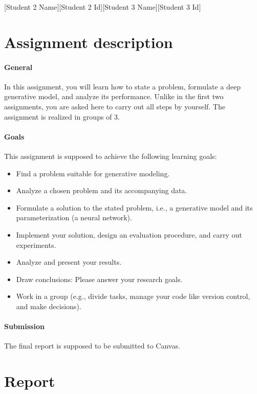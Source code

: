 \documentclass[a4 paper]{article}
\begin{document}
{[Student 2 Name]}{[Student 2 Id]}{[Student 3 Name]}{[Student 3 Id]}

\section{Assignment description}

\paragraph{General} In this assignment, you will learn how to state a problem, formulate a deep generative model, and analyze its performance. Unlike in the first two assignments, you are asked here to carry out all steps by yourself. The assignment is realized in groups of 3.

\paragraph{Goals} This assignment is supposed to achieve the following learning goals:
\begin{itemize}
    \item Find a problem suitable for generative modeling.
    \item Analyze a chosen problem and its accompanying data.
    \item Formulate a solution to the stated problem, i.e., a generative model and its parameterization (a neural network).
    \item Implement your solution, design an evaluation procedure, and carry out experiments.
    \item Analyze and present your results.
    \item Draw conclusions: Please answer your research goals.
    \item Work in a group (e.g., divide tasks, manage your code like version control, and make decisions).
\end{itemize}

\paragraph{Submission} The final report is supposed to be submitted to Canvas.

\newpage
\section{Report}
\end{document}
